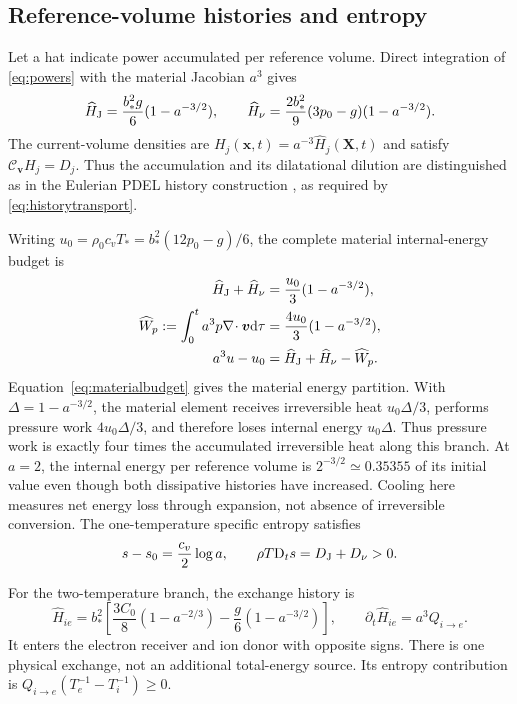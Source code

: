 \documentclass[11pt,a4paper]{article}
\theoremstyle{remark}\newtheorem{remark}{Remark}
\numberwithin{equation}{section}
\newcommand{\dd}{\mathrm{d}}
\newcommand{\vv}{\boldsymbol v}
\newcommand{\xx}{\boldsymbol x}
\newcommand{\XX}{\boldsymbol X}
\newcommand{\diver}{\nabla\!\cdot}
\newcommand{\Dt}{\mathrm D_t}
\newcommand{\Cv}{\mathcal C_{\vv}}
\begin{document}
\subsection{Reference-volume histories and entropy}
Let a hat indicate power accumulated per reference volume. Direct integration of \eqref{eq:powers} with the material Jacobian $a^3$ gives
\begin{equation}
\widehat H_{\rm J}=\frac{b_*^2g}{6}(1-a^{-3/2}),\qquad
\widehat H_\nu=\frac{2b_*^2}{9}(3p_0-g)(1-a^{-3/2}).
\label{eq:histories}
\end{equation}
The current-volume densities are $H_j(\xx,t)=a^{-3}\widehat H_j(\XX,t)$ and satisfy $\Cv H_j=D_j$. Thus the accumulation and its dilatational dilution are distinguished as in the Eulerian PDEL history construction \citep{RenEulerian}, as required by \eqref{eq:historytransport}.

Writing $u_0=\rho_0c_vT_*=b_*^2(12p_0-g)/6$, the complete material internal-energy budget is
\begin{equation}
\begin{aligned}
\widehat H_{\rm J}+\widehat H_\nu&=\frac{u_0}{3}(1-a^{-3/2}),\\
\widehat W_p:=\int_0^t a^3p\diver\vv\dd\tau
&=\frac{4u_0}{3}(1-a^{-3/2}),\\
a^3u-u_0&=\widehat H_{\rm J}+\widehat H_\nu-\widehat W_p.
\end{aligned}
\label{eq:materialbudget}
\end{equation}
Equation~\eqref{eq:materialbudget} gives the material energy partition. With $\Delta=1-a^{-3/2}$, the material element receives irreversible heat $u_0\Delta/3$, performs pressure work $4u_0\Delta/3$, and therefore loses internal energy $u_0\Delta$. Thus pressure work is exactly four times the accumulated irreversible heat along this branch. At $a=2$, the internal energy per reference volume is $2^{-3/2}\simeq0.35355$ of its initial value even though both dissipative histories have increased. Cooling here measures net energy loss through expansion, not absence of irreversible conversion. The one-temperature specific entropy satisfies
\begin{equation}
s-s_0=\frac{c_v}{2}\log a,\qquad
\rho T\Dt s=D_{\rm J}+D_\nu>0.
\label{eq:oneentropy}
\end{equation}

For the two-temperature branch, the exchange history is
\begin{equation}
\widehat H_{ie}=b_*^2
\left[\frac{3C_0}{8}(1-a^{-2/3})-\frac g6(1-a^{-3/2})\right],
\qquad \partial_t\widehat H_{ie}=a^3Q_{i\to e}.
\label{eq:exchangehistory}
\end{equation}
It enters the electron receiver and ion donor with opposite signs. There is one physical exchange, not an additional total-energy source. Its entropy contribution is $Q_{i\to e}(T_e^{-1}-T_i^{-1})\ge0$.
\end{document}
